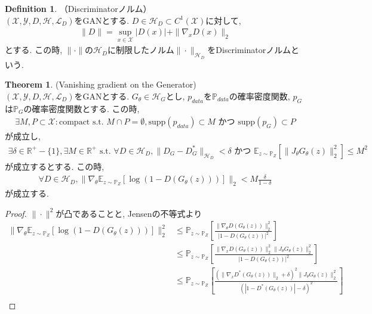 \documentclass[11pt, a4paper, dvipdfmx]{jsarticle}
\theoremstyle{definition}
\newtheorem{Definition+}[Axiom+]{Definition}
\newtheorem{Theorem+}[Axiom+]{Theorem}
\newcommand{\R}{\mathbb{R}}
\newcommand{\X}{\mathcal{X}}
\newcommand{\Y}{\mathcal{Y}}
\newcommand{\Hil}{\mathcal{H}}
\newcommand{\Loss}{\mathcal{L}_{D}}
\newcommand{\MLsp}{(\X, \Y, D, \Hil, \Loss)}
\begin{document}
\begin{Definition+}（Discriminatorノルム）\\
    $\MLsp$をGANとする. $D\in\Hil_{D}\subset C^{1}(\X)$に対して, 
    \begin{align*}
        \|D\| = \sup_{x\in\X}|D(x)| + \|\nabla_{x}D(x)\|_{2}
    \end{align*}
    とする. この時, $\|\cdot\|$の$\Hil_{D}$に制限したノルム$\|\cdot\|_{\Hil_{D}}$をDiscriminatorノルムという.
\end{Definition+}
\begin{Theorem+}(Vanishing gradient on the Generator)\\
    $\MLsp$をGANとする. $G_{\theta}\in\Hil_{G}$とし, $p_{data}$を$\mathbb{P}_{data}$の確率密度関数, $p_{G}$は$\mathbb{P}_{G}$の確率密度関数とする. この時, 
    \begin{align*}
        \exists M, P\subset\X:\text{compact s.t. }M\cap P = \emptyset, \text{supp}(p_{data})\subset M\text{ かつ }\text{supp}(p_{G})\subset P
    \end{align*}
    が成立し, 
    \begin{align*}
        \exists\delta\in\R^{+}-\{1\}, \exists M\in\R^{+}\text{ s.t. }\forall D\in\Hil_{D}, \|D_{G} - D_{G}^{*}\|_{\Hil_{D}} <\delta\text{ かつ }\mathbb{E}_{z\sim\mathbb{P}_{Z}}[\|J_{\theta}G_{\theta}(z)\|_{2}^{2}] \leq M^{2}
    \end{align*}
    が成立するとする. この時, 
    \begin{align*}
        \forall D\in\Hil_{D}, \|\nabla_{\theta}\mathbb{E}_{z\sim\mathbb{P}_{Z}}[\log(1 - D(G_{\theta}(z)))]\|_{2} < M\frac{\delta}{1 - \delta}
    \end{align*}
    が成立する.
    \begin{proof}
        $\|\cdot\|^{2}$が凸であることと, Jensenの不等式より
        \begin{align*}
            \|\nabla_{\theta}\mathbb{E}_{z\sim\mathbb{P}_{Z}}[\log(1 - D(G_{\theta}(z)))]\|_{2}^{2} &\leq\mathbb{P}_{z\sim\mathbb{P}_{Z}}\left[ \frac{\|\nabla_{\theta}D(G_{\theta}(z))\|_{2}^{2}}{|1 - D(G_{\theta}(z))|^{2}} \right]\\
                                                                                                    &\leq\mathbb{P}_{z\sim\mathbb{P}_{Z}}\left[ \frac{\|\nabla_{x}D(G_{\theta}(z))\|_{2}^{2}\|J_{\theta}G_{\theta}(z)\|_{2}^{2}}{|1 - D(G_{\theta}(z))|^{2}} \right]\\
                                                                                                    &\leq\mathbb{P}_{z\sim\mathbb{P}_{Z}}\left[ \frac{(\|\nabla_{x}D^{*}(G_{\theta}(z))\|_{2} + \delta)^{2}\|J_{\theta}G_{\theta}(z)\|_{2}^{2}}{(|1 - D^{*}(G_{\theta}(z))| - \delta)^{2}} \right]\\

\end{align*}
\end{proof}
\end{Theorem+}
\end{document}
